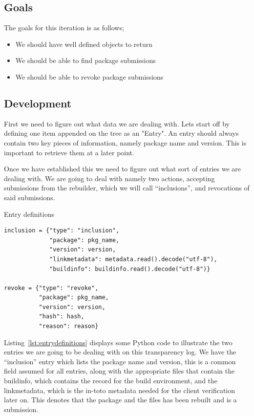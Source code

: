\documentclass[../Main/thesis.tex]{subfiles}
\begin{document}
\subsection*{Goals}%
\label{sub:fourth_iteration_goals}

The goals for this iteration is as follows;

\begin{itemize}
    \item We should have well defined objects to return
    \item We should be able to find package submissions
    \item We should be able to revoke package submissions
\end{itemize}

\subsection*{Development}%
\label{sub:fourth_iteration_development}
First we need to figure out what data we are dealing with. Lets start off by
defining one item appended on the tree as an "Entry". An entry should always
contain two key pieces of information, namely package name and version. This is
important to retrieve them at a later point.

Once we have established this we need to figure out what sort of entries we are
dealing with. We are going to deal with namely two actions, accepting
submissions from the rebuilder, which we will call ``inclusions'', and
revocations of said submissions. 

\begin{listing}[H]
\caption{Entry definitions}
\label{lst:entrydefinitions}
\begin{verbatim}
inclusion = {"type": "inclusion",
             "package": pkg_name,
             "version": version,
             "linkmetadata": metadata.read().decode("utf-8"),
             "buildinfo": buildinfo.read().decode("utf-8")}

revoke = {"type": "revoke",
          "package": pkg_name,
          "version": version,
          "hash": hash,
          "reason": reason}
\end{verbatim}
\end{listing}

Listing~\ref{lst:entrydefinitions} displays some Python code to illustrate the
two entries we are going to be dealing with on this transparency log. We have
the ``inclusion'' entry which lists the package name and version, this is a
common field assumed for all entries, along with the appropriate files that
contain the buildinfo, which contains the record for the build environment, and
the linkmetadata, which is the in-toto metadata needed for the client
verification later on. This denotes that the package and the files has been
rebuilt and is a submission.
\end{document}
